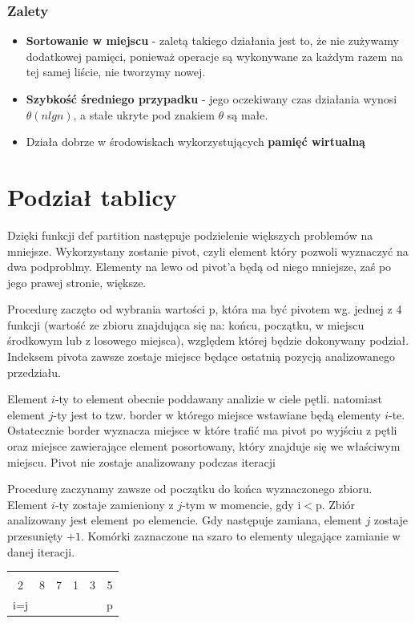 \documentclass[a4paper,11pt]{report}
\begin{document}
\subsubsection{Zalety}
\begin{itemize}
\item \textbf{Sortowanie w miejscu} - zaletą takiego działania jest to, że nie zużywamy dodatkowej pamięci, ponieważ operacje są wykonywane za każdym razem na tej samej liście, nie tworzymy nowej.
\item \textbf{Szybkość średniego przypadku} - jego oczekiwany czas działania wynosi $\theta(nlgn)$, a stałe ukryte pod znakiem $\theta$ są małe.
\item Działa dobrze w środowiskach wykorzystujących \textbf{pamięć wirtualną}
\end{itemize}
\newpage
\section{Podział tablicy}
Dzięki funkcji def partition następuje podzielenie większych problemów na mniejsze. Wykorzystany zostanie pivot, czyli element który pozwoli wyznaczyć na dwa podproblmy. Elementy na lewo od pivot'a będą od niego mniejsze, zaś po jego prawej stronie, większe.


Procedurę zaczęto od wybrania wartości p, która ma być pivotem wg. jednej z 4 funkcji (wartość ze zbioru znajdująca się na: końcu, początku, w miejscu środkowym lub z losowego miejsca), względem której będzie dokonywany podział. Indeksem pivota zawsze zostaje miejsce będące ostatnią pozycją analizowanego przedziału.


Element $i$-ty to element obecnie poddawany analizie w ciele pętli. natomiast element $j$-ty jest to tzw. border 
w którego miejsce wstawiane będą elementy $i$-te. Ostatecznie border wyznacza miejsce w które trafić ma pivot po wyjściu z pętli oraz miejsce zawierające element posortowany, który znajduje się we właściwym miejscu. Pivot nie zostaje analizowany podczas iteracji


Procedurę zaczynamy zawsze od początku do końca wyznaczonego zbioru. Element $i$-ty zostaje zamieniony z $j$-tym w momencie, gdy i$<$p. Zbiór analizowany jest element po elemencie. Gdy następuje zamiana, element $j$ zostaje przesunięty $+1$. Komórki zaznaczone na szaro to elementy ulegające zamianie w danej iteracji.
\begin{table}[h!]
\Large
\centering
\begin{tabular}{|c|c|c|c|c|c|}
\hline
\cellcolor{black!25} &  &  &  &  & \\
\cellcolor{black!25}2 & 8 & 7 & 1 & 3 & 5 \\ \hdashline
i=j&  & &  &  & p\\ \hline
\end{tabular}

\end{table}
\end{document}
